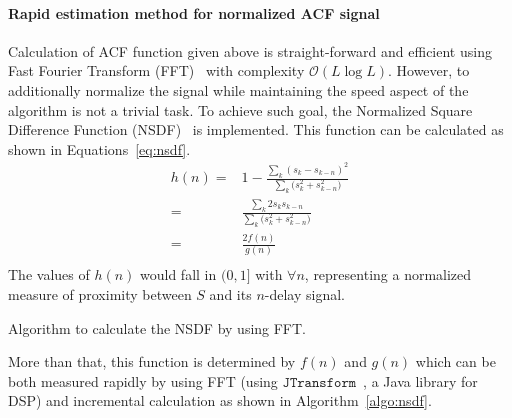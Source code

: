 \paragraph{Rapid estimation method for normalized ACF signal}
Calculation of ACF function given above is straight-forward and efficient using Fast Fourier Transform (FFT)~\cite{Gentleman1966FFT,Van1992FFT,Heideman1984FFT} with complexity $\mathcal{O}(L\log{L})$.
However, to additionally normalize the signal while maintaining the speed aspect of the algorithm is not a trivial task.
To achieve such goal, the Normalized Square Difference Function (NSDF)~\cite{Mcleod2005tartini} is implemented. This function can be calculated as shown in Equations~\ref{eq:nsdf}.
\begin{equation}
\label{eq:nsdf}   
\begin{array}{rr}
h(n)=& 1-\frac  {\displaystyle \sum_k{(s_k-s_{k-n})^2}}
                {\displaystyle \sum_k{(s_k^2+s_{k-n}^2})} \\
    =& \frac{\displaystyle \sum_{k}{2s_{k}s_{k-n}}}
            {\displaystyle \sum_k{(s_k^2+s_{k-n}^2})}\\
    =& \frac{\displaystyle 2f(n)}{\displaystyle g(n)}\\
\end{array}
\end{equation}
The values of $h(n)$ would fall in $(0,1]$ with $\forall n$, representing a normalized measure of proximity between $S$ and its $n$-delay signal. 

\begin{algorithm}[H]
\DontPrintSemicolon
{}
\caption{Algorithm to calculate the NSDF by using FFT.}
\label{algo:nsdf}
\end{algorithm}
More than that, this function is determined by $f(n)$ and $g(n)$ which can be both measured rapidly by using FFT (using $\mathtt{JTransform}$~\cite{Eichelberger2002jtransform}, a Java library for DSP) and incremental calculation as shown in Algorithm~\ref{algo:nsdf}.


